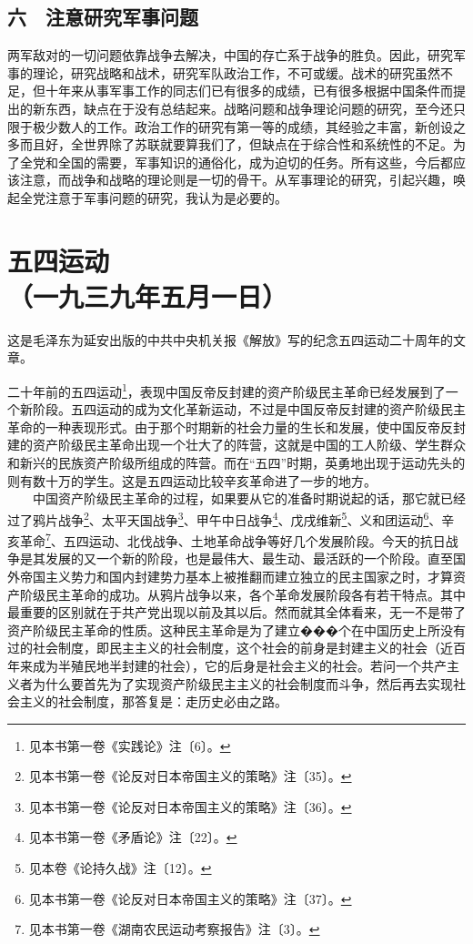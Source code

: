 \documentclass[cn,11pt,chinese]{elegantbook}
\def\myformat#1{\hfil\hfil #1}
\begin{document}
\subsection*{\myformat{六　注意研究军事问题}}
两军敌对的一切问题依靠战争去解决，中国的存亡系于战争的胜负。因此，研究军事的理论，研究战略和战术，研究军队政治工作，不可或缓。战术的研究虽然不足，但十年来从事军事工作的同志们已有很多的成绩，已有很多根据中国条件而提出的新东西，缺点在于没有总结起来。战略问题和战争理论问题的研究，至今还只限于极少数人的工作。政治工作的研究有第一等的成绩，其经验之丰富，新创设之多而且好，全世界除了苏联就要算我们了，但缺点在于综合性和系统性的不足。为了全党和全国的需要，军事知识的通俗化，成为迫切的任务。所有这些，今后都应该注意，而战争和战略的理论则是一切的骨干。从军事理论的研究，引起兴趣，唤起全党注意于军事问题的研究，我认为是必要的。\\
\newpage\section*{\myformat{五四运动}\\\myformat{（一九三九年五月一日）}}
\begin{introduction}\item  这是毛泽东为延安出版的中共中央机关报《解放》写的纪念五四运动二十周年的文章。\end{introduction}
二十年前的五四运动\footnote[1]{ 见本书第一卷《实践论》注〔6〕。}，表现中国反帝反封建的资产阶级民主革命已经发展到了一个新阶段。五四运动的成为文化革新运动，不过是中国反帝反封建的资产阶级民主革命的一种表现形式。由于那个时期新的社会力量的生长和发展，使中国反帝反封建的资产阶级民主革命出现一个壮大了的阵营，这就是中国的工人阶级、学生群众和新兴的民族资产阶级所组成的阵营。而在“五四”时期，英勇地出现于运动先头的则有数十万的学生。这是五四运动比较辛亥革命进了一步的地方。\\
　　中国资产阶级民主革命的过程，如果要从它的准备时期说起的话，那它就已经过了鸦片战争\footnote[2]{ 见本书第一卷《论反对日本帝国主义的策略》注〔35〕。}、太平天国战争\footnote[3]{ 见本书第一卷《论反对日本帝国主义的策略》注〔36〕。}、甲午中日战争\footnote[4]{ 见本书第一卷《矛盾论》注〔22〕。}、戊戌维新\footnote[5]{ 见本卷《论持久战》注〔12〕。}、义和团运动\footnote[6]{ 见本书第一卷《论反对日本帝国主义的策略》注〔37〕。}、辛亥革命\footnote[7]{ 见本书第一卷《湖南农民运动考察报告》注〔3〕。}、五四运动、北伐战争、土地革命战争等好几个发展阶段。今天的抗日战争是其发展的又一个新的阶段，也是最伟大、最生动、最活跃的一个阶段。直至国外帝国主义势力和国内封建势力基本上被推翻而建立独立的民主国家之时，才算资产阶级民主革命的成功。从鸦片战争以来，各个革命发展阶段各有若干特点。其中最重要的区别就在于共产党出现以前及其以后。然而就其全体看来，无一不是带了资产阶级民主革命的性质。这种民主革命是为了建立���个在中国历史上所没有过的社会制度，即民主主义的社会制度，这个社会的前身是封建主义的社会（近百年来成为半殖民地半封建的社会），它的后身是社会主义的社会。若问一个共产主义者为什么要首先为了实现资产阶级民主主义的社会制度而斗争，然后再去实现社会主义的社会制度，那答复是：走历史必由之路。\\
\end{document}

